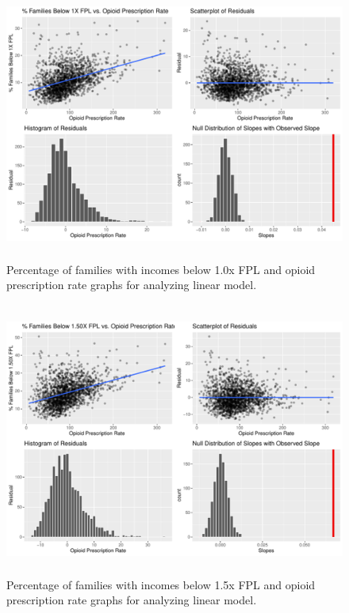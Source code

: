 \documentclass{article}
\newcommand{\<}{\langle}
\renewcommand{\>}{\rangle}
\theoremstyle{definition}
\begin{document}
\begin{figure}[H]
    \centering
    \includegraphics[height = 9cm]{P1_OPR.pdf}
    \caption{Percentage of families with incomes below 1.0x FPL and opioid prescription rate graphs for analyzing linear model.
}
    \label{fig:my_label}
\end{figure} 

\begin{figure}[H]
    \centering
    \includegraphics[height = 9cm]{P1_5_OPR.pdf}
    \caption{Percentage of families with incomes below 1.5x FPL and opioid prescription rate graphs for analyzing linear model.
}
    \label{fig:my_label}
\end{figure} 
\end{document}
